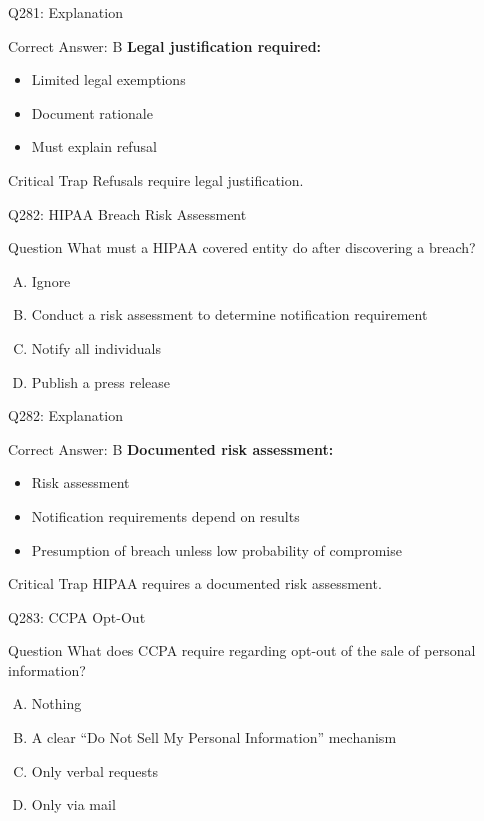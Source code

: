 \documentclass{beamer}
\begin{document}
	\begin{frame}{Q281: Explanation}
		\begin{block}{Correct Answer: B}
			\textbf{Legal justification required:}
			\begin{itemize}
				\item Limited legal exemptions
				\item Document rationale
				\item Must explain refusal
			\end{itemize}
		\end{block}
		\begin{alertblock}{Critical Trap}
			Refusals require legal justification.
		\end{alertblock}
	\end{frame}
	
	\begin{frame}{Q282: HIPAA Breach Risk Assessment}
		\begin{block}{Question}
			What must a HIPAA covered entity do after discovering a breach?
		\end{block}
		\begin{enumerate}[(A)]
			\item Ignore
			\item Conduct a risk assessment to determine notification requirement
			\item Notify all individuals
			\item Publish a press release
		\end{enumerate}
	\end{frame}
	
	\begin{frame}{Q282: Explanation}
		\begin{block}{Correct Answer: B}
			\textbf{Documented risk assessment:}
			\begin{itemize}
				\item Risk assessment
				\item Notification requirements depend on results
				\item Presumption of breach unless low probability of compromise
			\end{itemize}
		\end{block}
		\begin{alertblock}{Critical Trap}
			HIPAA requires a documented risk assessment.
		\end{alertblock}
	\end{frame}
	
	\begin{frame}{Q283: CCPA Opt-Out}
		\begin{block}{Question}
			What does CCPA require regarding opt-out of the sale of personal information?
		\end{block}
		\begin{enumerate}[(A)]
			\item Nothing
			\item A clear ``Do Not Sell My Personal Information'' mechanism
			\item Only verbal requests
			\item Only via mail
		\end{enumerate}
	\end{frame}
	
\end{document}
